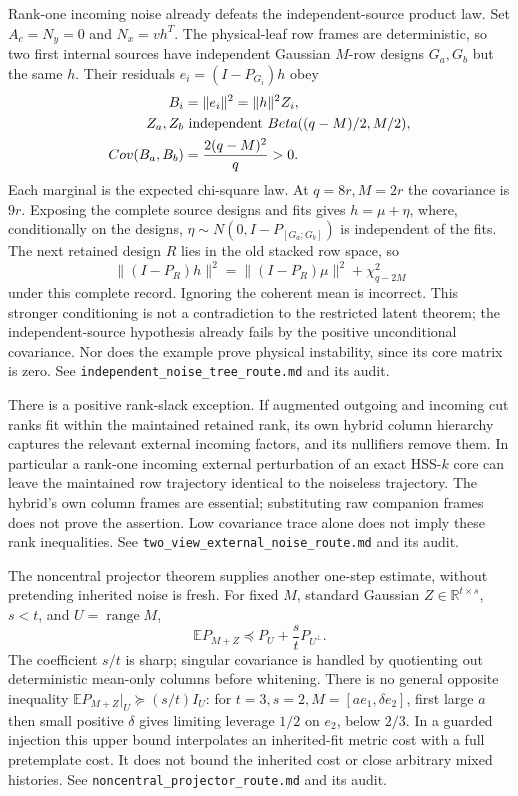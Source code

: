 \documentclass[11pt,oneside,openany,a4paper]{report}
\numberwithin{equation}{chapter}
\theoremstyle{definition}
\theoremstyle{remark}
\newcommand{\sourcefile}[1]{{\small\nolinkurl{#1}}}
\begin{document}
Rank-one incoming noise already defeats the independent-source product
law.  Set $A_c=N_y=0$ and $N_x=vh^T$.  The physical-leaf row frames
are deterministic, so two first internal sources have independent
Gaussian $M$-row designs $G_a,G_b$ but the same $h$.  Their residuals
$e_i=(I-P_{G_i})h$ obey
\[
 \begin{aligned}
 B_i&=\|e_i\|^2=\|h\|^2Z_i,\\
 Z_a,Z_b&\ \hbox{independent }
     \operatorname{Beta}((q-M)/2,M/2),\\
 \operatorname{Cov}(B_a,B_b)&=\frac{2(q-M)^2}{q}>0.
 \end{aligned}
\]
Each marginal is the expected chi-square law.  At $q=8r,M=2r$ the
covariance is $9r$.  Exposing the complete source designs and fits gives
$h=\mu+\eta$, where, conditionally on the designs,
$\eta\sim N(0,I-P_{[G_a;G_b]})$ is independent of the fits.  The next
retained design $R$ lies in the old stacked row space, so
\[
 \|(I-P_R)h\|^2
 =\|(I-P_R)\mu\|^2+\chi^2_{q-2M}
\]
under this complete record.  Ignoring the coherent mean is incorrect.
This stronger conditioning is not a contradiction to the restricted
latent theorem; the independent-source hypothesis already fails by the
positive unconditional covariance.  Nor does the example prove physical
instability, since its core matrix is zero.
See \sourcefile{independent_noise_tree_route.md} and its audit.

There is a positive rank-slack exception.  If augmented outgoing and
incoming cut ranks fit within the maintained retained rank, its own
hybrid column hierarchy captures the relevant external incoming factors,
and its nullifiers remove them.  In particular a rank-one incoming
external perturbation of an exact HSS-$k$ core can leave the maintained
row trajectory identical to the noiseless trajectory.  The hybrid's
own column frames are essential; substituting raw companion frames
does not prove the assertion.  Low covariance trace alone does not
imply these rank inequalities.  See
\sourcefile{two_view_external_noise_route.md} and its audit.

The noncentral projector theorem supplies another one-step estimate,
without pretending inherited noise is fresh.  For fixed $M$, standard
Gaussian $Z\in\mathbb R^{t\times s}$, $s<t$, and $U=\operatorname{range}M$,
\[
 \mathbb E P_{M+Z}\preceq P_U+\frac st P_{U^\perp}.
\]
The coefficient $s/t$ is sharp; singular covariance is handled by
quotienting out deterministic mean-only columns before whitening.
There is no general opposite inequality
$\mathbb E P_{M+Z}|_U\succeq(s/t)I_U$: for
$t=3,s=2,M=[a e_1,\delta e_2]$, first large $a$ then small positive
$\delta$ gives limiting leverage $1/2$ on $e_2$, below $2/3$.
In a guarded injection this upper bound interpolates an inherited-fit
metric cost with a full pretemplate cost.  It does not bound the
inherited cost or close arbitrary mixed histories.
See \sourcefile{noncentral_projector_route.md} and its audit.
\end{document}
